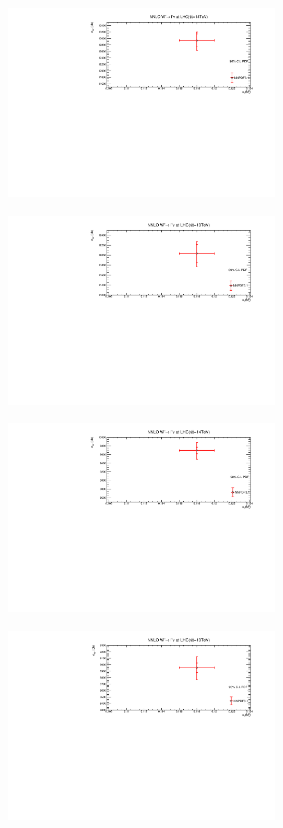 \begin{figure}[H]
\begin{subfigure}{0.49\textwidth}
\vspace*{-8mm}
\caption{}
\label{z13_90}
\end{subfigure}
\begin{subfigure}{0.49\textwidth}
\includegraphics[height=5cm, width=\textwidth]{chapter4/Wp14_90.pdf}
\vspace*{-8mm}
\caption{}
\label{wp14_90}
\end{subfigure}
\begin{subfigure}{0.49\textwidth}
\includegraphics[height=5cm, width=\textwidth]{chapter4/Wp13_90.pdf}
\vspace*{-8mm}
\caption{}
\label{wp13_90}
\end{subfigure}
\begin{subfigure}{0.49\textwidth}
\includegraphics[height=5cm, width=\textwidth]{chapter4/Wm14_90.pdf}
\vspace*{-8mm}
\caption{}
\label{wm14_90}
\end{subfigure}
\begin{subfigure}{0.49\textwidth}
\includegraphics[height=5cm, width=\textwidth]{chapter4/Wm13_90.pdf}

\end{subfigure}
\end{figure}
